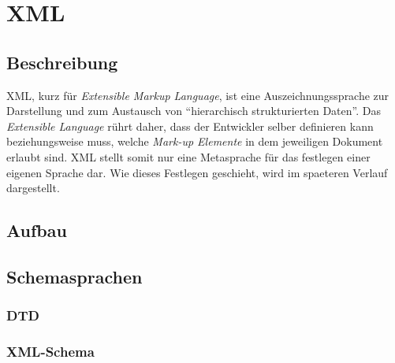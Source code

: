 \chapter{XML}
\section{Beschreibung}
XML, kurz für {\em Extensible Markup Language}, ist eine
Auszeichnungssprache zur Darstellung und zum Austausch von
\enquote{hierarchisch strukturierten Daten}\cite{wiki:de:xml}. Das
{\em Extensible Language} rührt daher, dass der Entwickler selber
definieren kann beziehungsweise muss, welche {\em Mark-up Elemente} in
dem jeweiligen Dokument erlaubt sind. XML stellt somit nur eine
Metasprache für das festlegen einer eigenen Sprache dar. Wie dieses
Festlegen geschieht, wird im spaeteren Verlauf dargestellt.

\section{Aufbau}


\section{Schemasprachen}
\subsection{DTD}
\subsection{XML-Schema}